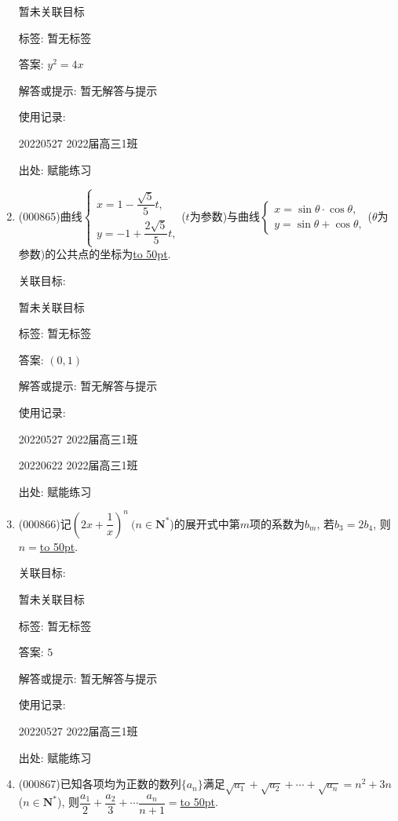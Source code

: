 \documentclass[10pt,a4paper]{article}
\newcommand{\blank}[1]{\underline{\hbox to #1pt{}}}
\begin{document}
\begin{enumerate}[1.]
暂未关联目标



标签: 暂无标签

答案: $y^2=4x$

解答或提示: 暂无解答与提示

使用记录:

20220527	2022届高三1班	


出处: 赋能练习
\item { (000865)}曲线$\begin{cases} x=1-\dfrac{\sqrt5}5 t, \\ y=-1+\dfrac{2\sqrt5}5t, \end{cases}$($t$为参数)与曲线$\begin{cases} x=\sin \theta \cdot \cos \theta, \\ y=\sin \theta +\cos \theta,  \end{cases}$($\theta$为参数)的公共点的坐标为\blank{50}.


关联目标:

暂未关联目标



标签: 暂无标签

答案: $(0,1)$

解答或提示: 暂无解答与提示

使用记录:

20220527	2022届高三1班	

20220622	2022届高三1班  	


出处: 赋能练习
\item { (000866)}记$(2x+\dfrac1x)^n \ (n\in \mathbf{N}^*$)的展开式中第$m$项的系数为$b_m$, 若$b_3=2b_4$, 则$n=$\blank{50}.


关联目标:

暂未关联目标



标签: 暂无标签

答案: $5$

解答或提示: 暂无解答与提示

使用记录:

20220527	2022届高三1班	


出处: 赋能练习
\item { (000867)}已知各项均为正数的数列$\{a_n\}$满足$\sqrt{a_1}+\sqrt{a_2}+\cdots+\sqrt{a_n}=n^2+3n$($n\in \mathbf{N}^*$), 则$\dfrac{a_1}2+\dfrac{a_2}3+\cdots \dfrac{a_n}{n+1}=$\blank{50}.



\end{enumerate}
\end{document}
